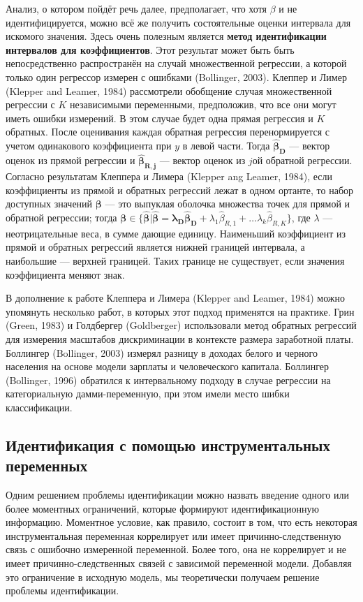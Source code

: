 Анализ, о котором пойдёт речь далее, предполагает, что хотя $\beta$ и не идентифицируется, можно всё же получить состоятельные оценки интервала для искомого значения. Здесь очень полезным является {\bf метод идентификации интервалов для коэффициентов}. Этот результат может быть быть непосредственно распространён на случай множественной регрессии, а которой только один регрессор измерен с ошибками (Bollinger, 2003). Клеппер и Лимер (Klepper and Leamer, 1984) рассмотрели обобщение случая множественной регрессии с $K$ независимыми переменными, предположив, что все они могут иметь ошибки измерений. В этом случае будет одна прямая регрессия и $K$ обратных. После оценивания каждая обратная регрессия перенормируется с учетом одинакового коэффициента при $y$ в левой части. Тогда $\mathbf{\widehat{\beta}_{D}}$ --- вектор оценок из прямой регрессии и $\mathbf{\widehat{\beta}_{R,j}}$ --- вектор оценок из $j$ой обратной регрессии. Согласно результатам Клеппера и Лимера (Klepper ang Leamer, 1984), если коэффициенты из прямой и обратных регрессий лежат в одном ортанте, то набор доступных значений $\mathbf{\beta}$ --- это выпуклая оболочка множества точек для прямой и обратной регрессии; тогда $\mathbf{\beta} \in \{ \mathbf{\widehat{\beta}|\widehat{\beta}=\lambda_D \widehat{\beta}_D}+\lambda_1 \widehat{\beta}_{R,1}+ \dots \lambda_k \widehat{\beta}_{R,K} \}$, где $\lambda$ --- неотрицательные веса, в сумме дающие единицу. Наименьший коэффициент из прямой и обратных регрессий является нижней границей интервала, а наибольшие --- верхней границей. Таких границе не существует, если значения коэффициента меняют знак.

В дополнение к работе Клеппера и Лимера (Klepper and Leamer, 1984) можно упомянуть несколько работ, в которых этот подход применятся на практике. Грин (Green, 1983) и Голдбергер (Goldberger) использовали метод обратных регрессий для измерения масштабов дискриминации в контексте размера заработной платы. Боллингер (Bollinger, 2003) измерял разницу в доходах белого и черного населения на основе модели зарплаты и человеческого капитала. Боллингер (Bollinger, 1996) обратился к интервальному подходу в случае регрессии на категориальную дамми-переменную, при этом имели место шибки классификации.

\subsection{Идентификация с помощью инструментальных переменных} 
Одним решением проблемы идентификации можно назвать введение одного или более моментных ограничений, которые формируют идентификационную информацию. Моментное условие, как правило, состоит в том, что есть некоторая инструментальная переменная коррелирует или имеет причинно-следственную связь с ошибочно измеренной переменной. Более того, она не коррелирует и не имеет причинно-следственных связей с зависимой переменной модели. Добавляя это ограничение в исходную модель, мы теоретически получаем решение проблемы идентификации.

